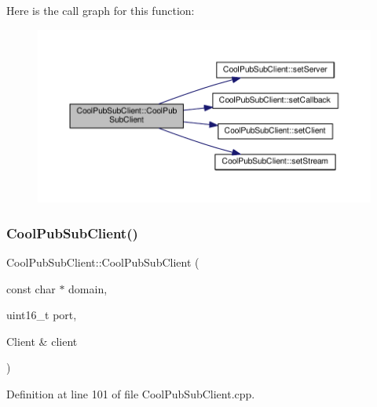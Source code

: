 Here is the call graph for this function\+:\nopagebreak
\begin{figure}[H]
\begin{center}
\leavevmode
\includegraphics[width=350pt]{class_cool_pub_sub_client_a08309a2cf058099fa5c96c198f777647_cgraph}
\end{center}
\end{figure}
\mbox{\label{class_cool_pub_sub_client_a469eefe7429f0cbb6d7d443b52488411}} 
\subsubsection{\texorpdfstring{Cool\+Pub\+Sub\+Client()}{CoolPubSubClient()}\hspace{0.1cm}{\footnotesize\ttfamily [11/14]}}
{\footnotesize\ttfamily Cool\+Pub\+Sub\+Client\+::\+Cool\+Pub\+Sub\+Client (\begin{DoxyParamCaption}\item[{const char $\ast$}]{domain,  }\item[{uint16\+\_\+t}]{port,  }\item[{Client \&}]{client }\end{DoxyParamCaption})}



Definition at line 101 of file Cool\+Pub\+Sub\+Client.\+cpp.

